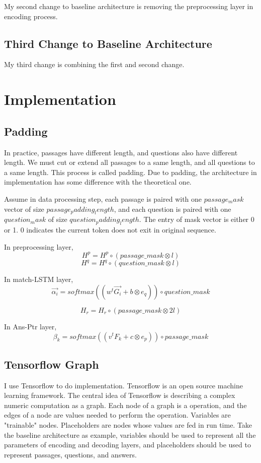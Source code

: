 \documentclass[modernstyle,12pt]{sjsuthesis}
\theoremstyle{definition}
\begin{document}
My second change to baseline architecture is removing the preprocessing layer in encoding process.

\section{Third Change to Baseline Architecture}

My third change is combining the first and second change.

\chapter{Implementation}

\section{Padding}

In practice, passages have different length, and questions also have different length. We must cut or extend all passages to a same length, and all questions to a same length. This process is called padding. Due to padding, the architecture in implementation has some difference with the theoretical one.

Assume in data processing step, each passage is paired with one $passage_mask$ vector of size $passage_padding_length$, and each question is paired with one $question_mask$ of size $question_padding_length$. The entry of mask vector is either 0 or 1. 0 indicates the current token does not exit in original sequence.

In preprocessing layer,
$$H^p = H^p \circ (passage\_mask \otimes l)$$
$$H^q = H^q \circ (question\_mask \otimes l)$$

In match-LSTM layer,
$$\overrightarrow{\alpha _i} = softmax( (w^t\overrightarrow{G_i} + b \otimes e_q) ) \circ question\_mask $$


$$H_r = H_r \circ (passage\_mask \otimes 2l)$$

In Ans-Ptr layer,
$$\beta _k = softmax( (v^tF_k + c \otimes e_p) ) \circ passage\_mask$$


\section{Tensorflow Graph}
I use Tensorflow to do implementation. Tensorflow is an open source machine learning framework. The central idea of Tensorflow is describing a complex numeric computation as a graph. Each node of a graph is a operation, and the edges of a node are values needed to perform the operation. Variables are "trainable" nodes. Placeholders are nodes whose values are fed in run time. Take the baseline architecture as example, variables should be used to represent all the parameters of encoding and decoding layers, and placeholders should be used to represent passages, questions, and answers.
\end{document}
